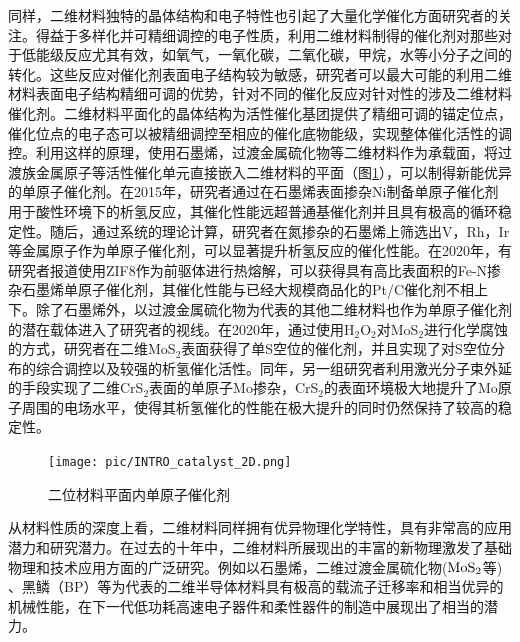     同样，二维材料独特的晶体结构和电子特性也引起了大量化学催化方面研究者的关注。得益于多样化并可精细调控的电子性质，利用二维材料制得的催化剂对那些对于低能级反应尤其有效，如氧气，一氧化碳，二氧化碳，甲烷，水等小分子之间的转化。这些反应对催化剂表面电子结构较为敏感，研究者可以最大可能的利用二维材料表面电子结构精细可调的优势，针对不同的催化反应对针对性的涉及二维材料催化剂。二维材料平面化的晶体结构为活性催化基团提供了精细可调的锚定位点，催化位点的电子态可以被精细调控至相应的催化底物能级，实现整体催化活性的调控。利用这样的原理，使用石墨烯，过渡金属硫化物等二维材料作为承载面，将过渡族金属原子等活性催化单元直接嵌入二维材料的平面（图\ref{fig:intro_2DM-catalyst}），可以制得新能优异的单原子催化剂。在2015年，研究者通过在石墨烯表面掺杂Ni制备单原子催化剂用于酸性环境下的析氢反应，其催化性能远超普通基催化剂并且具有极高的循环稳定性。随后，通过系统的理论计算，研究者在氮掺杂的石墨烯上筛选出V，Rh，Ir等金属原子作为单原子催化剂，可以显著提升析氢反应的催化性能。在2020年，有研究者报道使用ZIF8作为前驱体进行热熔解，可以获得具有高比表面积的Fe-N掺杂石墨烯单原子催化剂，其催化性能与已经大规模商品化的Pt/C催化剂不相上下。除了石墨烯外，以过渡金属硫化物为代表的其他二维材料也作为单原子催化剂的潜在载体进入了研究者的视线。在2020年，通过使用H$_2$O$_2$对MoS$_2$进行化学腐蚀的方式，研究者在二维MoS$_2$表面获得了单S空位的催化剂，并且实现了对S空位分布的综合调控以及较强的析氢催化活性。同年，另一组研究者利用激光分子束外延的手段实现了二维CrS$_2$表面的单原子Mo掺杂，CrS$_2$的表面环境极大地提升了Mo原子周围的电场水平，使得其析氢催化的性能在极大提升的同时仍然保持了较高的稳定性。

    \begin{figure}[htb]
        \texttt{[image: pic/INTRO\_catalyst\_2D.png]}
        \caption{二位材料平面内单原子催化剂}
        \label{fig:intro_2DM-catalyst}
    \end{figure}

    从材料性质的深度上看，二维材料同样拥有优异物理化学特性，具有非常高的应用潜力和研究潜力。在过去的十年中，二维材料所展现出的丰富的新物理激发了基础物理和技术应用方面的广泛研究。例如以石墨烯，二维过渡金属硫化物($\rm{MoS_{2}}$等) 、黑鳞（BP）等为代表的二维半导体材料具有极高的载流子迁移率和相当优异的机械性能，在下一代低功耗高速电子器件和柔性器件的制造中展现出了相当的潜力。

